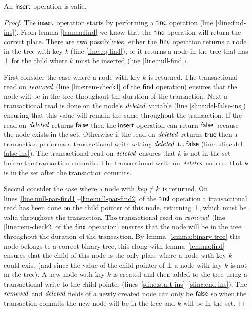 \begin{theorem}
\label{theorem:insert-valid2}
An $\act{insert}$ operation is valid.
\end{theorem}
\begin{proof}
The $\act{insert}$ operation starts by performing a $\act{find}$ operation (line \ref{sline:find-ins}).
From lemma \ref{lemma:find} we know that the $\act{find}$ operation will return the correct place.
There are two possibilities, either the $\act{find}$ operation returns a node in the tree with key $k$ (line \ref{line:eq-find}),
or it returns a node in the tree that has $\bot$ for the child where $k$ must be inserted (line \ref{line:null-find}).

First consider the case where a node with key $k$ is returned.
The transactional read on $\ms{removed}$ (line \ref{line:rem-check1} of the $\act{find}$ operation) ensures that the node will be in the tree throughout the duration of the transaction.
Next a transactional read is done on the node's $\ms{deleted}$ variable (line \ref{sline:del-false-ins}) ensuring that this value will remain the same throughout the transaction.
If the read on $\ms{deleted}$ returns $\lit{false}$ then the $\act{insert}$ operation can return $\lit{false}$ because the node exists in the set.
Otherwise if the read on $\ms{deleted}$ returns $\lit{true}$ then a transaction performs a transactional write setting $\ms{deleted}$ to $\lit{false}$ (line \ref{sline:del-false-ins}).
The transactional read on $\ms{deleted}$ ensures that $k$ is not in the set before the transaction commits.
The transactional write on $\ms{deleted}$ ensures that $k$ is in the set after the transaction commits.

Second consider the case where a node with $\ms{key} \neq k$ is returned.
On lines~\ref{line:null-par-find1}--\ref{line:null-par-find2} of the $\act{find}$ operation a transactional read has been done on the child pointer of this node, returning $\bot$, which must be valid throughout the transaction.
The transactional read on $\ms{removed}$ (line \ref{line:rem-check2} of the $\act{find}$ operation) ensures that the node will be in the tree throughout the duration of the transaction.
By lemma~\ref{lemma:binary-tree} this node belongs to a correct binary tree, this along with lemma~\ref{lemma:find} ensures that the child of this node is the only place where a node with key $k$ could exist
(and since the value of the child pointer of $\bot$ a node with key $k$ is not in the tree).
A new node with key $k$ is created and then added to the tree using a transactional write to the child pointer (lines~\ref{sline:start-ins}--\ref{sline:end-ins}).
The $\ms{removed}$ and $\ms{deleted}$ fields of a newly created node can only be $\lit{false}$ so when the transaction commits the new node will be in the tree and $k$ will be in the set.
\end{proof}



